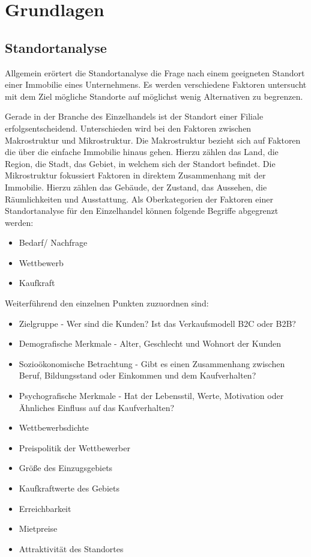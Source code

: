 \chapter{Grundlagen}
\section{Standortanalyse}
Allgemein erörtert die Standortanalyse die Frage nach einem geeigneten Standort einer Immobilie eines Unternehmens. Es werden verschiedene Faktoren untersucht mit dem Ziel mögliche Standorte auf möglichst wenig Alternativen zu begrenzen. 

Gerade in der Branche des Einzelhandels ist der Standort einer Filiale erfolgsentscheidend. 
Unterschieden wird bei den Faktoren zwischen Makrostruktur und Mikrostruktur.
Die Makrostruktur bezieht sich auf Faktoren die über die einfache Immobilie hinaus gehen. Hierzu zählen das Land, die Region, die Stadt, das Gebiet, in welchem sich der Standort befindet.
Die Mikrostruktur fokussiert Faktoren in direktem Zusammenhang mit der Immobilie. Hierzu zählen das Gebäude, der Zustand, das Aussehen, die Räumlichkeiten und Ausstattung.
Als Oberkategorien der Faktoren einer Standortanalyse für den Einzelhandel können folgende Begriffe abgegrenzt werden:
\begin{itemize}
	\item Bedarf/ Nachfrage
	\item Wettbewerb
	\item Kaufkraft
\end{itemize}

Weiterführend den einzelnen Punkten zuzuordnen sind:
\begin{itemize}
	\item Zielgruppe - Wer sind die Kunden? Ist das Verkaufsmodell B2C oder B2B?
	\item Demografische Merkmale - Alter, Geschlecht und Wohnort der Kunden
	\item Sozioökonomische Betrachtung - Gibt es einen Zusammenhang zwischen Beruf, Bildungsstand oder Einkommen und dem Kaufverhalten?
	\item Psychografische Merkmale - Hat der Lebensstil, Werte, Motivation oder Ähnliches Einfluss auf das Kaufverhalten?
	\item Wettbewerbsdichte
	\item Preispolitik der Wettbewerber
	\item Größe des Einzugsgebiets
	\item Kaufkraftwerte des Gebiets
	\item Erreichbarkeit
	\item Mietpreise
	\item Attraktivität des Standortes
\end{itemize}

